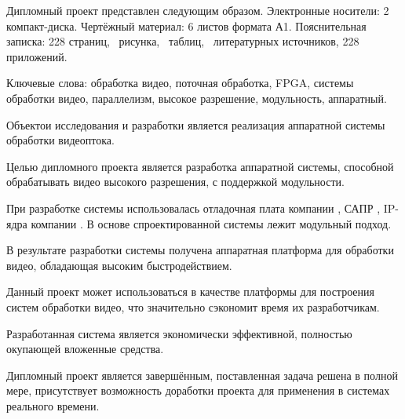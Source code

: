 \thispagestyle{empty}

Дипломный проект представлен следующим образом. Электронные носители: 2 компакт-диска.
Чертёжный материал: 6 листов формата А1. Пояснительная записка: 228 страниц, \totfig{}~рисунка,
\tottab{}~таблиц, \totref{}~литературных источников, 228 приложений.

Ключевые слова: обработка видео, поточная обработка, FPGA, системы обработки видео,
параллелизм, высокое разрешение, модульность, аппаратный.

Объектои исследования и разработки является реализация аппаратной системы обработки видеоптока.

Целью дипломного проекта является разработка аппаратной системы, способной обрабатывать видео высокого
разрешения, с поддержкой модульности.

При разработке системы использовалась отладочная плата компании , САПР ,
IP-ядра компании . В основе спроектированной системы лежит модульный подход.

В результате разработки системы получена аппаратная платформа для обработки видео, обладающая высоким
быстродействием.

Данный проект может использоваться в качестве платформы для построения систем обработки видео,
что значительно сэкономит время их разработчикам.

Разработанная система является экономически эффективной, полностью окупающей вложенные средства.

Дипломный проект является завершённым, поставленная задача решена в полной мере, присутствует возможность
доработки проекта для применения в системах реального времени.

\clearpage
